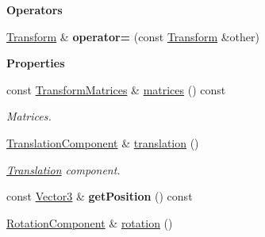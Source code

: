 \begin{Indent}\textbf{ Operators}\par
\begin{DoxyCompactItemize}
\item 
\mbox{\label{classrev_1_1_transform_aa370e756e990730a662550f4dd23c1a7}} 
\mbox{\hyperlink{classrev_1_1_transform}{Transform}} \& {\bfseries operator=} (const \mbox{\hyperlink{classrev_1_1_transform}{Transform}} \&other)
\end{DoxyCompactItemize}
\end{Indent}
\begin{Indent}\textbf{ Properties}\par
\begin{DoxyCompactItemize}
\item 
\mbox{\label{classrev_1_1_transform_ab15216bacb8858f1e486d82f40593bcd}} 
const \mbox{\hyperlink{structrev_1_1_transform_matrices}{Transform\+Matrices}} \& \mbox{\hyperlink{classrev_1_1_transform_ab15216bacb8858f1e486d82f40593bcd}{matrices}} () const
\begin{DoxyCompactList}\small\item\em Matrices. \end{DoxyCompactList}\item 
\mbox{\label{classrev_1_1_transform_aa304dd6ab90008e0c6fde46e263d3e93}} 
\mbox{\hyperlink{classrev_1_1_translation_component}{Translation\+Component}} \& \mbox{\hyperlink{classrev_1_1_transform_aa304dd6ab90008e0c6fde46e263d3e93}{translation}} ()
\begin{DoxyCompactList}\small\item\em \mbox{\hyperlink{structrev_1_1_translation}{Translation}} component. \end{DoxyCompactList}\item 
\mbox{\label{classrev_1_1_transform_a2de2301bef81ae67c0c420117271dd83}} 
const \mbox{\hyperlink{classrev_1_1_vector}{Vector3}} \& {\bfseries get\+Position} () const
\item 
\mbox{\label{classrev_1_1_transform_ab6f61407589970718fe582c2277e881b}} 
\mbox{\hyperlink{classrev_1_1_rotation_component}{Rotation\+Component}} \& \mbox{\hyperlink{classrev_1_1_transform_ab6f61407589970718fe582c2277e881b}{rotation}} ()

\end{DoxyCompactItemize}
\end{Indent}
